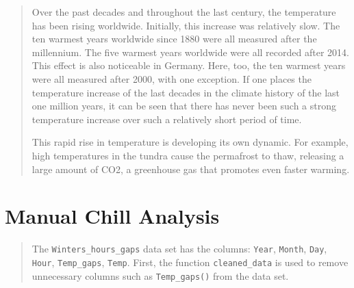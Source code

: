 \documentclass[
]{book}
\newenvironment{Shaded}{\begin{snugshade}}{\end{snugshade}}
\newcommand{\CommentTok}[1]{\textcolor[rgb]{0.56,0.35,0.01}{\textit{#1}}}
\newcommand{\ControlFlowTok}[1]{\textcolor[rgb]{0.13,0.29,0.53}{\textbf{#1}}}
\newcommand{\DataTypeTok}[1]{\textcolor[rgb]{0.13,0.29,0.53}{#1}}
\newcommand{\DecValTok}[1]{\textcolor[rgb]{0.00,0.00,0.81}{#1}}
\newcommand{\KeywordTok}[1]{\textcolor[rgb]{0.13,0.29,0.53}{\textbf{#1}}}
\newcommand{\NormalTok}[1]{#1}
\newcommand{\OperatorTok}[1]{\textcolor[rgb]{0.81,0.36,0.00}{\textbf{#1}}}
\newcommand{\StringTok}[1]{\textcolor[rgb]{0.31,0.60,0.02}{#1}}
\begin{document}
\begin{quote}
Over the past decades and throughout the last century, the temperature has been rising worldwide. Initially, this increase was relatively slow. The ten warmest years worldwide since 1880 were all measured after the millennium. The five warmest years worldwide were all recorded after 2014. This effect is also noticeable in Germany. Here, too, the ten warmest years were all measured after 2000, with one exception. If one places the temperature increase of the last decades in the climate history of the last one million years, it can be seen that there has never been such a strong temperature increase over such a relatively short period of time.

This rapid rise in temperature is developing its own dynamic. For example, high temperatures in the tundra cause the permafrost to thaw, releasing a large amount of CO2, a greenhouse gas that promotes even faster warming.
\end{quote}

\hypertarget{manual-chill-analysis}{%
\chapter{Manual Chill Analysis}\label{manual-chill-analysis}}

\begin{quote}
The \texttt{Winters\_hours\_gaps} data set has the columns: \texttt{Year}, \texttt{Month}, \texttt{Day}, \texttt{Hour}, \texttt{Temp\_gaps}, \texttt{Temp}. First, the function \texttt{cleaned\_data} is used to remove unnecessary columns such as \texttt{Temp\_gaps()} from the data set.
\end{quote}

\begin{Shaded}
\end{Shaded}
\end{document}
